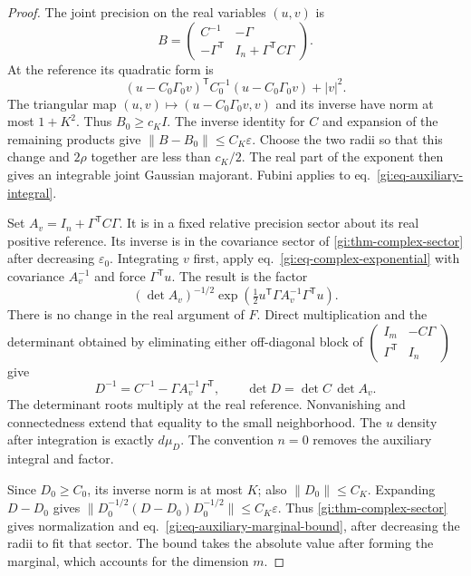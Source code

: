 \documentclass[11pt,letterpaper,reqno]{amsart}
\numberwithin{equation}{section}
\renewcommand{\eqref}[1]{\textup{eq.~\ref{#1}}}
\theoremstyle{definition}
\theoremstyle{remark}
\begin{document}
\begin{proof}
The joint precision on the real variables \((u,v)\) is
\[
 B=\begin{pmatrix}
    C^{-1}&-\Gamma\\
    -\Gamma^{\mathsf T}&I_n+\Gamma^{\mathsf T}C\Gamma
   \end{pmatrix}.
\]
At the reference its quadratic form is
\[
 (u-C_0\Gamma_0v)^{\mathsf T}C_0^{-1}(u-C_0\Gamma_0v)+|v|^2 .
\]
The triangular map \((u,v)\mapsto(u-C_0\Gamma_0v,v)\)
and its inverse have norm at most \(1+K^2\). Thus \(B_0\ge c_K I\).
The inverse identity for \(C\) and expansion of the remaining
products give \(\|B-B_0\|\le C_K\varepsilon\).
Choose the two radii so that this change and \(2\rho\) together
are less than \(c_K/2\). The real part of the exponent then
gives an integrable joint Gaussian majorant. Fubini applies to
\eqref{gi:eq-auxiliary-integral}.

Set \(A_v=I_n+\Gamma^{\mathsf T}C\Gamma\). It is in a fixed
relative precision sector about its real positive reference.
Its inverse is in the covariance sector of
\cref{gi:thm-complex-sector} after decreasing
\(\varepsilon_0\). Integrating \(v\) first, apply
\eqref{gi:eq-complex-exponential} with covariance \(A_v^{-1}\)
and force \(\Gamma^{\mathsf T}u\). The result is the factor
\[
 (\det A_v)^{-1/2}
       \exp\!\left(\tfrac12u^{\mathsf T}
             \Gamma A_v^{-1}\Gamma^{\mathsf T}u\right).
\]
There is no change in the real argument of \(F\). Direct
multiplication and the determinant obtained by eliminating either
off-diagonal block of
\(\left(\begin{smallmatrix} I_m&-C\Gamma\\
\Gamma^{\mathsf T}&I_n\end{smallmatrix}\right)\)
give
\[
 D^{-1}=C^{-1}-\Gamma A_v^{-1}\Gamma^{\mathsf T},
 \qquad \det D=\det C\,\det A_v .
\]
The determinant roots multiply at the real reference. Nonvanishing
and connectedness extend that equality to the small neighborhood.
The \(u\) density after integration is exactly \(d\mu_D\).
The convention \(n=0\) removes the auxiliary integral and factor.

Since \(D_0\ge C_0\), its inverse norm is at most \(K\);
also \(\|D_0\|\le C_K\).
Expanding \(D-D_0\) gives
\(\|D_0^{-1/2}(D-D_0)D_0^{-1/2}\|\le C_K\varepsilon\).
Thus \cref{gi:thm-complex-sector} gives normalization and
\eqref{gi:eq-auxiliary-marginal-bound}, after decreasing the
radii to fit that sector. The bound takes the absolute value
after forming the marginal, which accounts for the dimension
\(m\).
\end{proof}
\end{document}
